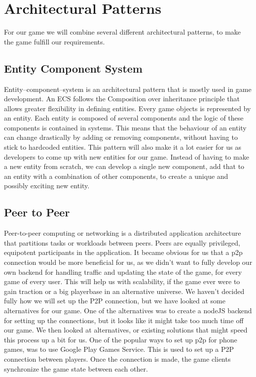 \section{Architectural Patterns}
For our game we will combine several different architectural patterns, to make the game fulfill our requirements.

\subsection{Entity Component System}
Entity–component–system \cite{wiki:ecs} is an architectural pattern that is mostly used in game development. An ECS follows the Composition over inheritance principle that allows greater flexibility in defining entities.
Every game objects is represented by an entity. Each entity is composed of several components and the logic of these components is contained in systems. This means that the behaviour of an entity can change drastically by adding or removing components, without having to stick to hardcoded entities.
This pattern will also make it a lot easier for us as developers to come up with new entities for our game. Instead of having to make a new entity from scratch, we can develop a single new component, add that to an entity with a combination of other components, to create a unique and possibly exciting new entity.

\subsection{Peer to Peer}
Peer-to-peer \cite{wiki:p2p} computing or networking is a distributed application architecture that partitions tasks or workloads between peers. Peers are equally privileged, equipotent participants in the application.
It became obvious for us that a p2p connection would be more beneficial for us, as we didn't want to fully develop our own backend for handling traffic and updating the state of the game, for every game of every user. This will help us with scalability, if the game ever were to gain traction or a big playerbase in an alternative universe.
We haven't decided fully how we will set up the P2P connection, but we have looked at some alternatives for our game.
One of the alternatives was to create a nodeJS backend for setting up the connections, but it looks like it might take too much time off our game. We then looked at alternatives, or existing solutions that might speed this process up a bit for us.
One of the popular ways to set up p2p for phone games, was to use Google Play Games Service. This is used to set up a P2P connection between players. Once the connection is made, the game clients synchronize the game state between each other.

